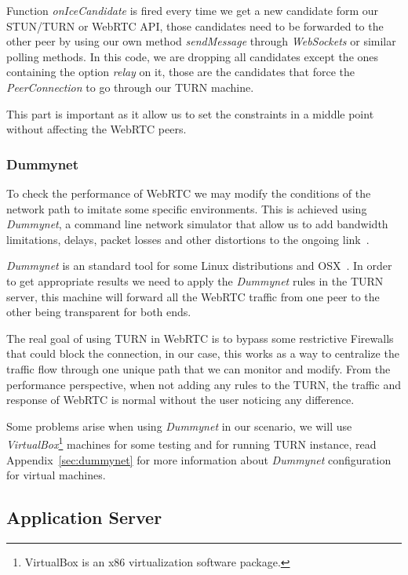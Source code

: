 Function {\it onIceCandidate} is fired every time we get a new candidate form our STUN/TURN or WebRTC API, those candidates need to be forwarded to the other peer by using our own method {\it sendMessage} through {\it WebSockets} or similar polling methods. In this code, we are dropping all candidates except the ones containing the option {\it relay} on it, those are the candidates that force the {\it PeerConnection} to go through our TURN machine.

This part is important as it allow us to set the constraints in a middle point without affecting the WebRTC peers.

\subsubsection{Dummynet}

To check the performance of WebRTC we may modify the conditions of the network path to imitate some specific environments. This is achieved using {\it Dummynet}, a command line network simulator that allow us to add bandwidth limitations, delays, packet losses and other distortions to the ongoing link~\cite{dummynetTool}.

{\it Dummynet} is an standard tool for some Linux distributions and OSX~\cite{dummynetTool}. In order to get appropriate results we need to apply the {\it Dummynet} rules in the TURN server, this machine will forward all the WebRTC traffic from one peer to the other being transparent for both ends. 

The real goal of using TURN in WebRTC is to bypass some restrictive Firewalls that could block the connection, in our case, this works as a way to centralize the traffic flow through one unique path that we can monitor and modify. From the performance perspective, when not adding any rules to the TURN, the traffic and response of WebRTC is normal without the user noticing any difference.

Some problems arise when using {\it Dummynet} in our scenario, we will use {\it VirtualBox}\footnote{VirtualBox is an x86 virtualization software package.} machines for some testing and for running TURN instance, read Appendix~\ref{sec:dummynet} for more information about {\it Dummynet} configuration for virtual machines.

\subsection{Application Server}

